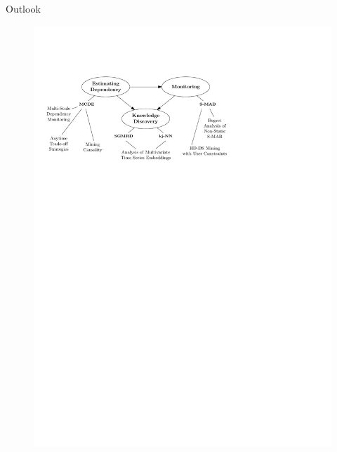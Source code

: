 \documentclass[16pt,usenames,dvipsnames, notheorems]{beamer}
\theoremstyle{definition}
\theoremstyle{example}
\theoremstyle{plain}
\begin{document}
\begin{frame}{Outlook}

\begin{figure}
	\centering
	\begin{overprint}
		 \includegraphics[width=1.0 \linewidth]{figures/futurework_6-compressed.pdf}
	\end{overprint}
\end{figure}

\end{frame}
\end{document}
